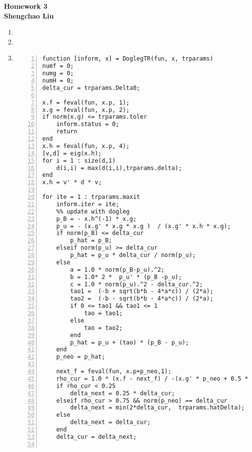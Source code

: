 \documentclass[12pt]{article}
\begin{document}
\begin{center} {\Large
{\bf Homework 3\\Shengchao Liu}}
\end{center}

\begin{enumerate}

\item

\clearpage




\item

\clearpage












\item

\begin{lstlisting}[language={[ANSI]C}, numbers=left, numberstyle=\tiny, frame=shadowbox, basicstyle=\ttfamily\small, showspaces=false, breaklines=true, showstringspaces=false, showtabs=false]
 function [inform, x] = DoglegTR(fun, x, trparams)
numf = 0;
numg = 0;
numH = 0;
delta_cur = trparams.Delta0;

x.f = feval(fun, x.p, 1);
x.g = feval(fun, x.p, 2);
if norm(x.g) <= trparams.toler
    inform.status = 0;
    return
end
x.h = feval(fun, x.p, 4);
[v,d] = eig(x.h);
for i = 1 : size(d,1)
    d(i,i) = max(d(i,i),trparams.delta);
end
x.h = v' * d * v;

for ite = 1 : trparams.maxit
    inform.iter = ite;
    %% update with dogleg
    p_B = - x.h^(-1) * x.g;
    p_u = - (x.g' * x.g * x.g )  / (x.g' * x.h * x.g);
    if norm(p_B) <= delta_cur
        p_hat = p_B;
    elseif norm(p_u) >= delta_cur
        p_hat = p_u * delta_cur / norm(p_u);
    else
        a = 1.0 * norm(p_B-p_u).^2;
        b = 1.0* 2 *  p_u' * (p_B -p_u);
        c = 1.0 * norm(p_u).^2 - delta_cur.^2;
        tao1 =  (-b + sqrt(b*b - 4*a*c)) / (2*a);
        tao2 =  (-b - sqrt(b*b - 4*a*c)) / (2*a);
        if 0 <= tao1 && tao1 <= 1
            tao = tao1;
        else
            tao = tao2;
        end
        p_hat = p_u + (tao) * (p_B - p_u);
    end
    p_neo = p_hat;

    next_f = feval(fun, x.p+p_neo,1);
    rho_cur = 1.0 * (x.f - next_f) / -(x.g' * p_neo + 0.5 * p_neo' * x.h * p_neo );
    if rho_cur < 0.25
        delta_next = 0.25 * delta_cur;
    elseif rho_cur > 0.75 && norm(p_neo) == delta_cur
        delta_next = min(2*delta_cur,  trparams.hatDelta);
    else
        delta_next = delta_cur;
    end
    delta_cur = delta_next;


\end{lstlisting}
\end{enumerate}
\end{document}
